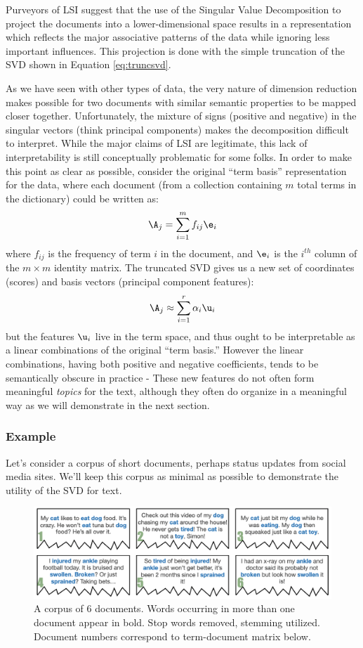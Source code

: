 \documentclass[
]{article}
\theoremstyle{definition}
\theoremstyle{definition}
\theoremstyle{definition}
\theoremstyle{definition}
\theoremstyle{remark}
\begin{document}
Purveyors of LSI suggest that the use of the Singular Value Decomposition to project the documents into a lower-dimensional space results in a representation which reflects the major associative patterns of the data while ignoring less important influences. This projection is done with the simple truncation of the SVD shown in Equation \eqref{eq:truncsvd}.

As we have seen with other types of data, the very nature of dimension reduction makes possible for two documents with similar semantic properties to be mapped closer together. Unfortunately, the mixture of signs (positive and negative) in the singular vectors (think principal components) makes the decomposition difficult to interpret. While the major claims of LSI are legitimate, this lack of interpretability is still conceptually problematic for some folks. In order to make this point as clear as possible, consider the original ``term basis'' representation for the data, where each document (from a collection containing \(m\) total terms in the dictionary) could be written as:
\[\A_j = \sum_{i=1}^{m} f_{ij}\e_i\]
where \(f_{ij}\) is the frequency of term \(i\) in the document, and \(\e_i\) is the \(i^{th}\) column of the \(m\times m\) identity matrix. The truncated SVD gives us a new set of coordinates (scores) and basis vectors (principal component features):
\[\A_j \approx \sum_{i=1}^r \alpha_i \u_i\]
but the features \(\u_i\) live in the term space, and thus ought to be interpretable as a linear combinations of the original ``term basis.'' However the linear combinations, having both positive and negative coefficients, tends to be semantically obscure in practice - These new features do not often form meaningful \emph{topics} for the text, although they often do organize in a meaningful way as we will demonstrate in the next section.

\hypertarget{example}{%
\subsubsection{Example}\label{example}}

Let's consider a corpus of short documents, perhaps status updates from social media sites. We'll keep this corpus as minimal as possible to demonstrate the utility of the SVD for text.

\begin{figure}

{\centering \includegraphics[width=1\linewidth]{figs/documents} 

}

\caption{A corpus of 6 documents. Words occurring in more than one document appear in bold. Stop words removed, stemming utilized. Document numbers correspond to term-document matrix below.}\label{fig:studentgraph}
\end{figure}
\end{document}
